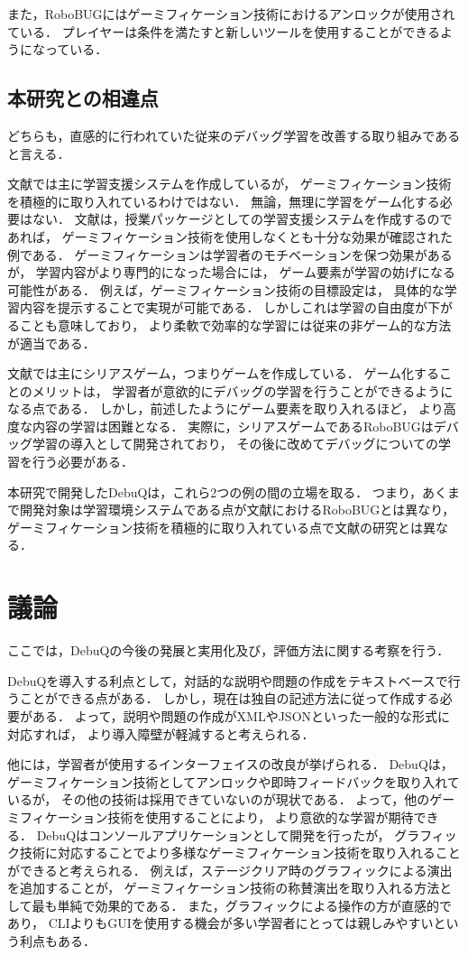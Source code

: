 \documentclass{jreport}
\begin{document}
また，RoboBUGにはゲーミフィケーション技術におけるアンロックが使用されている．
プレイヤーは条件を満たすと新しいツールを使用することができるようになっている．

\subsection{本研究との相違点}
どちらも，直感的に行われていた従来のデバッグ学習を改善する取り組みであると言える．

文献\cite{Yama}では主に学習支援システムを作成しているが，
ゲーミフィケーション技術を積極的に取り入れているわけではない．
無論，無理に学習をゲーム化する必要はない．
文献\cite{Yama}は，授業パッケージとしての学習支援システムを作成するのであれば，
ゲーミフィケーション技術を使用しなくとも十分な効果が確認された例である．
ゲーミフィケーションは学習者のモチベーションを保つ効果があるが，
学習内容がより専門的になった場合には，
ゲーム要素が学習の妨げになる可能性がある．
例えば，ゲーミフィケーション技術の目標設定は，
具体的な学習内容を提示することで実現が可能である．
しかしこれは学習の自由度が下がることも意味しており，
より柔軟で効率的な学習には従来の非ゲーム的な方法が適当である．

文献\cite{robobug}では主にシリアスゲーム，つまりゲームを作成している．
ゲーム化することのメリットは，
学習者が意欲的にデバッグの学習を行うことができるようになる点である．
しかし，前述したようにゲーム要素を取り入れるほど，
より高度な内容の学習は困難となる．
実際に，シリアスゲームであるRoboBUGはデバッグ学習の導入として開発されており，
その後に改めてデバッグについての学習を行う必要がある．

本研究で開発したDebuQは，これら2つの例の間の立場を取る．
つまり，あくまで開発対象は学習環境システムである点が文献\cite{robobug}におけるRoboBUGとは異なり，
ゲーミフィケーション技術を積極的に取り入れている点で文献\cite{Yama}の研究とは異なる．

\section{議論}
ここでは，DebuQの今後の発展と実用化及び，評価方法に関する考察を行う．

DebuQを導入する利点として，対話的な説明や問題の作成をテキストベースで行うことができる点がある．
しかし，現在は独自の記述方法に従って作成する必要がある．
よって，説明や問題の作成がXMLやJSONといった一般的な形式に対応すれば，
より導入障壁が軽減すると考えられる．

他には，学習者が使用するインターフェイスの改良が挙げられる．
DebuQは，ゲーミフィケーション技術としてアンロックや即時フィードバックを取り入れているが，
その他の技術は採用できていないのが現状である．
よって，他のゲーミフィケーション技術を使用することにより，
より意欲的な学習が期待できる．
DebuQはコンソールアプリケーションとして開発を行ったが，
グラフィック技術に対応することでより多様なゲーミフィケーション技術を取り入れることができると考えられる．
例えば，ステージクリア時のグラフィックによる演出を追加することが，
ゲーミフィケーション技術の称賛演出を取り入れる方法として最も単純で効果的である．
また，グラフィックによる操作の方が直感的であり，
CLIよりもGUIを使用する機会が多い学習者にとっては親しみやすいという利点もある．
\end{document}
